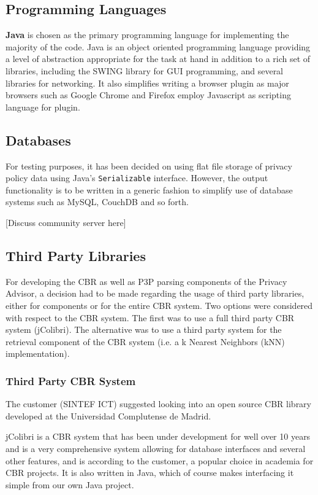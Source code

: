 \subsection{Programming Languages}
\textbf{Java} is chosen as the primary programming language for implementing the majority of the code. Java is an object oriented programming language providing a level of abstraction appropriate for the task at hand in addition to a rich set of libraries, including the SWING library for GUI programming, and several libraries for networking. It also simplifies writing a browser plugin as major browsers such as Google Chrome and Firefox employ Javascript as scripting language for plugin.

\subsection{Databases}
For testing purposes, it has been decided on using flat file storage of privacy policy data using Java's \texttt{Serializable} interface. However, the output functionality is to be written in a generic fashion to simplify use of database systems such as MySQL, CouchDB and so forth. 

[Discuss community server here]

\subsection{Third Party Libraries}
 
For developing the CBR as well as P3P parsing components of the Privacy Advisor, a decision had to be made regarding the usage of third party libraries, either for components or for the entire CBR system. Two options were considered with respect to the CBR system. The first was to use a full third party CBR system (jColibri). The alternative was to use a third party system for the retrieval component of the CBR system (i.e. a k Nearest Neighbors (kNN) implementation).

\subsubsection{Third Party CBR System}
The customer (SINTEF ICT) suggested looking into an open source CBR library developed at the Universidad Complutense de Madrid.
 
jColibri is a CBR system that has been under development for well over 10 years and is a very comprehensive system allowing for database interfaces and several other features,  and is according to the customer, a popular choice in academia for CBR projects. It is also written in Java, which of course makes interfacing it simple from our own Java project.
 
